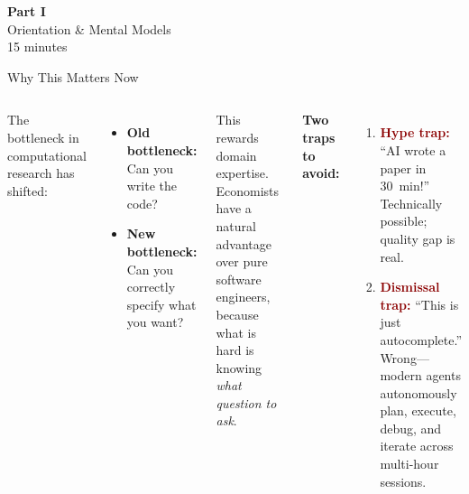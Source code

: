 \documentclass[aspectratio=169,10pt]{beamer}
\newcommand{\emphc}[1]{\textcolor{harvardcrimson}{#1}}
\begin{document}

\begin{frame}{}
\vfill
\begin{center}
{\Huge \textcolor{uzhblue}{\textbf{Part I}}}\\[12pt]
{\LARGE Orientation \& Mental Models}\\[6pt]
{\small 15 minutes}
\end{center}
\vfill
\end{frame}

\begin{frame}{Why This Matters Now}
\small
\begin{columns}[T]
The bottleneck in computational research has \emphc{shifted}:

\vspace{0.4em}
\begin{itemize}\itemsep2pt
    \item \textbf{Old bottleneck:} Can you write the code?
    \item \textbf{New bottleneck:} Can you correctly \emphc{specify what you want}?
\end{itemize}

\vspace{0.3em}
This rewards \emphc{domain expertise}. Economists have a natural advantage over pure software engineers, because what is hard is knowing \emph{what question to ask}.

\vspace{0.4em}
\textbf{Two traps to avoid:}
\begin{enumerate}\itemsep1pt
    \item \textcolor{darkred}{\textbf{Hype trap:}} ``AI wrote a paper in 30~min!''\\
    {\small Technically possible; quality gap is real.}
    \item \textcolor{darkred}{\textbf{Dismissal trap:}} ``This is just autocomplete.''\\
    {\small Wrong---modern agents autonomously plan, execute, debug, and iterate across multi-hour sessions.}
\end{enumerate}


\end{columns}
\end{frame}
\end{document}
